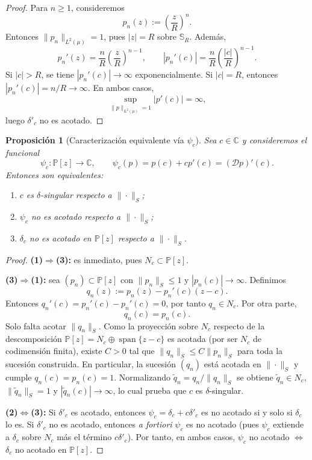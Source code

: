 \documentclass[12pt,a4paper]{article}
\newtheorem{proposition}{Proposición}
\theoremstyle{definition}
\theoremstyle{remark}
\newcommand{\C}{\mathbb{C}}
\newcommand{\Poly}{\mathbb{P}[z]}
\newcommand{\D}{\mathcal{D}}
\begin{document}
\begin{proof}
  Para $n\ge 1$, consideremos
  \[
    p_n(z):=\left(\frac{z}{R}\right)^n.
  \]
  Entonces $\|p_n\|_{L^2(\mu)}=1$, pues $|z|=R$ sobre $\mathbb{S}_R$. Además,
  \[
    p_n'(z)=\frac{n}{R}\left(\frac{z}{R}\right)^{n-1},
    \qquad
    |p_n'(c)|=\frac{n}{R}\left(\frac{|c|}{R}\right)^{n-1}.
  \]
  Si $|c|>R$, se tiene $|p_n'(c)|\to\infty$ exponencialmente. Si $|c|=R$,
  entonces $|p_n'(c)|=n/R\to\infty$. En ambos casos,
  \[
    \sup_{\|p\|_{L^2(\mu)}=1}|p'(c)|=\infty,
  \]
  luego $\delta'_c$ no es acotado.
\end{proof}


\begin{proposition}[Caracterización equivalente vía $\psi_c$]\label{prop:caracterizacion_psi_c}
  Sea $c\in\C$ y consideremos el funcional
  \[
    \psi_c:\Poly\to\C,\qquad \psi_c(p)=p(c)+cp'(c)=(\D p)'(c).
  \]
  Entonces son equivalentes:
  \begin{enumerate}
    \item $c$ es $\delta$-singular respecto a $\|\cdot\|_S$;
    \item $\psi_c$ no es acotado respecto a $\|\cdot\|_S$;
    \item $\delta_c$ no es acotado en $\Poly$ respecto a $\|\cdot\|_S$.
  \end{enumerate}
\end{proposition}

\begin{proof}
  \textbf{(1)$\Rightarrow$(3):} es inmediato, pues $N_c\subset\Poly$.

  \textbf{(3)$\Rightarrow$(1):} sea $(p_n)\subset\Poly$ con
  $\|p_n\|_S\le 1$ y $|p_n(c)|\to\infty$. Definimos
  \[
    q_n(z):=p_n(z)-p_n'(c)(z-c).
  \]
  Entonces $q_n'(c)=p_n'(c)-p_n'(c)=0$, por tanto $q_n\in N_c$.
  Por otra parte,
  \[
    q_n(c)=p_n(c).
  \]
  Solo falta acotar $\|q_n\|_S$. Como la proyección sobre $N_c$ respecto de la descomposición
  $\Poly=N_c\oplus\operatorname{span}\{z-c\}$ es acotada (por ser $N_c$ de codimensión
  finita), existe $C>0$ tal que $\|q_n\|_S\le C\|p_n\|_S$ para toda la sucesión
  construida. En particular, la sucesión $(q_n)$ está acotada en $\|\cdot\|_S$
  y cumple $q_n(c)=p_n(c)=1$. Normalizando $\tilde q_n=q_n/\|q_n\|_S$ se obtiene
  $\tilde q_n\in N_c$, $\|\tilde q_n\|_S=1$ y $|\tilde q_n(c)|\to\infty$,
  lo cual prueba que $c$ es $\delta$-singular.

  \textbf{(2)$\iff$(3):} Si $\delta'_c$ es acotado, entonces
  $\psi_c=\delta_c+c\delta'_c$ es no acotado si y solo si $\delta_c$ lo es.
  Si $\delta'_c$ no es acotado, entonces \emph{a fortiori} $\psi_c$ es no
  acotado (pues $\psi_c$ extiende a $\delta_c$ sobre $N_c$ más el término
  $c\delta'_c$). Por tanto, en ambos casos, $\psi_c$ no acotado
  $\Longleftrightarrow$ $\delta_c$ no acotado en $\Poly$.
\end{proof}
\end{document}
